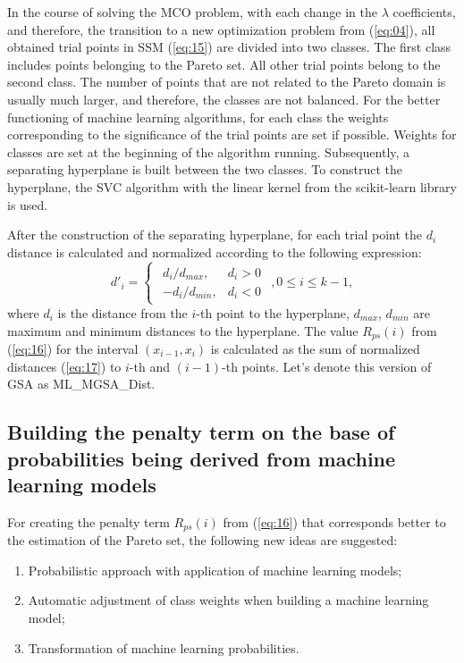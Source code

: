 \documentclass[runningheads]{llncs}
\begin{document}
In the course of solving the MCO problem, with each change in the $\lambda$ coefficients, and therefore, the transition to a new optimization problem from (\ref{eq:04}), all obtained trial points in SSM (\ref{eq:15}) are divided into two classes. The first class includes points belonging to the Pareto set. All other trial points belong to the second class. The number of points that are not related to the Pareto domain is usually much larger, and therefore, the classes are not balanced. For the better functioning of machine learning algorithms, for each class the weights corresponding to the significance of the trial points are set if possible. Weights for classes are set at the beginning of the algorithm running. Subsequently, a separating  hyperplane is built between the two classes. To construct the hyperplane, the SVC algorithm with the linear kernel from the scikit-learn library \cite{SVM_2000,PROB_2004} is used.

After the construction of the separating hyperplane, for each trial point the $d_i$ distance is calculated and normalized according to the following expression:
\begin{equation}
    \label{eq:17}
d'_i=
\begin{cases}
  \begin{matrix}
     d_i / d_{max}, & d_i > 0 \\
     -d_i / d_{min}, & d_i < 0 
  \end{matrix}
\end{cases}, 
0 \leq i \leq k-1,
\end{equation}
where $d_i$ is the distance from the $i$-th point to the hyperplane, $d_{max}$, $d_{min}$ are maximum and minimum distances to the hyperplane.
The value $R_{ps}(i)$ from (\ref{eq:16}) for the interval $(x_{i-1},x_{i})$ is calculated as the sum of normalized distances (\ref{eq:17}) to $i$-th and $(i-1)$-th points. Let's denote this version of GSA as ML\_MGSA\_Dist.

\subsection{Building the penalty term on the base of probabilities being derived from machine learning models}
\label{ssec:42}

For creating the penalty term $R_{ps}(i)$ from (\ref{eq:16}) that corresponds better to the estimation of the Pareto set, the following new ideas are suggested: 
\begin{enumerate}
	\item Probabilistic approach with application of machine learning models;   
	\item Automatic adjustment of class weights when building a machine learning model;
	\item Transformation of machine learning probabilities.
\end{enumerate}
\end{document}
